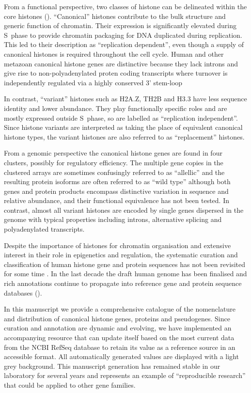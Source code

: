   From a functional perspective, two classes of histone can be delineated within the core histones (). 
  ``Canonical'' histones contribute to the bulk structure and generic function of chromatin. 
  Their expression is significantly elevated during S~phase to provide chromatin packaging 
  for DNA duplicated during replication. This led to their description as ``replication dependent'', 
  even though a supply of canonical histones is required throughout the cell cycle. 
  Human and other metazoan canonical histone genes are distinctive 
  because they lack introns and give rise to non-polyadenylated proten coding transcripts 
  where turnover is independently regulated via a highly conserved 3' stem-loop
  
  In contrast, ``variant'' histones such as H2A.Z, TH2B and H3.3 have less sequence identity and lower abundance. 
  They play functionally specific roles and are mostly expressed outside S~phase, 
  so are labelled as ``replication independent''. 
  Since histone variants are interpreted as taking the place of equivalent canonical histone types, 
  the variant histones are also referred to as ``replacement'' histones.
  
  From a genomic perspective the canonical histone genes are found in four clusters, possibly for regulatory efficiency. 
  The multiple gene copies in the clustered arrays are sometimes confusingly referred to as ``allellic'' 
  and the resulting protein isoforms are often referred to as ``wild type'' 
  although both genes and protein products encompass distinctive variation in sequence and relative abundance, 
  and their functional equivalence has not been tested.
  In contrast, almost all variant histones are encoded by single genes dispersed in the genome 
  with typical properties including introns, alternative splicing and polyadenylated transcripts.
  
  Despite the importance of histones for chromatin organisation and extensive interest
  in their role in epigenetics and regulation, the systematic curation and classification of human histone
  gene and protein sequences has not been revisited for some time \citep{Marzluff02}.
  In the last decade the draft human genome has been finalised 
  and rich annotations continue to propagate into reference gene and protein sequence databases ().

  In this manuscript we provide a comprehensive catalogue of the nomenclature and distribution 
  of canonical histone genes, proteins and pseudogenes. 
  Since curation and annotation are dynamic and evolving, we have implemented an accompanying resource 
  that can update itself based on the most current data from the NCBI RefSeq database 
  to retain its value as a reference source in an accessible format.
  All automatically generated values are displayed with a light grey background.
  This manuscript generation has remained stable in our laboratory for several years
  and represents an example of ``reproducible research'' 
  that could be applied to other gene families.

